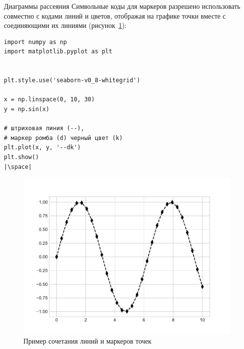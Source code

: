 \documentclass[aspectratio=169, mathserif]{beamer}	%
\begin{document}
\begin{frame}[fragile, label=m]{Диаграммы рассеяния}
\scriptsize
Символьные коды для маркеров разрешено использовать совместно с кодами линий и цветов, отображая на графике точки вместе с соединяющими их линиями (рисунок~\ref{fig:fig_15}):
\begin{minipage}{.4\textwidth}
\begin{verbatim}
import numpy as np
import matplotlib.pyplot as plt


plt.style.use('seaborn-v0_8-whitegrid')

x = np.linspace(0, 10, 30)
y = np.sin(x)

# штриховая линия (--),
# маркер ромба (d) черный цвет (k)
plt.plot(x, y, '--dk')
plt.show()
|\space|
\end{verbatim}
\end{minipage}
\begin{minipage}{.59\textwidth}
\begin{figure}[h!]
	\centering
	\includegraphics[width=.85\linewidth]{./pics/Figure_15}
	\caption{Пример сочетания линий и маркеров точек}
	\label{fig:fig_15}
\end{figure}
\end{minipage}
\vfill
\end{frame}
\end{document}
